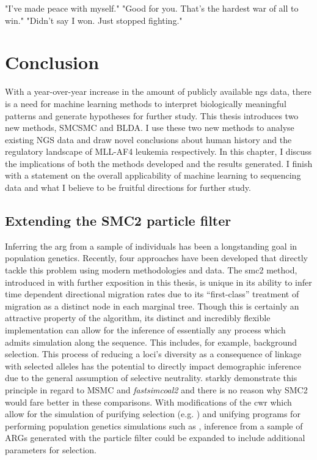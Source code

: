 \begin{savequote}[8cm]

	"I've made peace with myself."\newline
	"Good for you. That's the hardest war of all to win."\newline
	"Didn't say I won. Just stopped fighting."\newline
\end{savequote}

\chapter{Conclusion}

With a year-over-year increase in the amount of publicly available \gls{ngs} data, there is a need for machine learning methods to interpret biologically meaningful patterns and generate hypotheses for further study. This thesis introduces two new methods, SMCSMC and BLDA. I use these two new methods to analyse existing NGS data and draw novel conclusions about human history and the regulatory landscape of MLL-AF4 leukemia respectively. In this chapter, I discuss the implications of both the methods developed and the results generated. I finish with a statement on the overall applicability of machine learning to sequencing data and what I believe to be fruitful directions for further study.  

\section{Extending the SMC2 particle filter}

Inferring the \gls{arg} from a sample of individuals has been a longstanding goal in population genetics. Recently, four approaches have been developed that directly tackle this problem using modern methodologies and data. The \gls{smc2} method, introduced in \textcite{10.1371/journal.pone.0247647} with further exposition in this thesis, is unique in its ability to infer time dependent directional migration rates due to its ``first-class'' treatment of migration as a distinct node in each marginal tree. Though this is certainly an attractive property of the algorithm, its distinct and incredibly flexible implementation can allow for the inference of essentially any process which admits simulation along the sequence. This includes, for example, background selection. This process of reducing a loci's diversity as a consequence of linkage with selected alleles has the potential to directly impact demographic inference due to the general assumption of selective neutrality. \textcite{Johri2021} starkly demonstrate this principle in regard to MSMC and \textit{fastsimcoal2} and there is no reason why SMC2 would fare better in these comparisons. With modifications of the \gls{cwr} which allow for the simulation of purifying selection (e.g. \cite{Zeng2012}) and unifying programs for performing population genetics simulations such as \textcite{Adrion2020a}, inference from a sample of ARGs generated with the particle filter could be expanded to include additional parameters for selection. 

